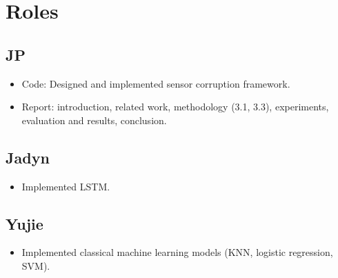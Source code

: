 \appendix

\section{Roles}

\subsection*{JP}
\begin{itemize}
    \item Code: Designed and implemented sensor corruption framework.
    \item Report: introduction, related work, methodology (3.1, 3.3), experiments, evaluation and results, conclusion.
\end{itemize}

\subsection*{Jadyn}
\begin{itemize}
    \item Implemented LSTM.
\end{itemize}

\subsection*{Yujie}
\begin{itemize}
    \item Implemented classical machine learning models (KNN, logistic regression, SVM).
\end{itemize}
